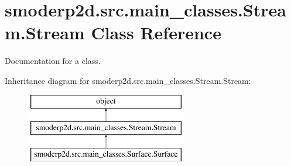 \hypertarget{classsmoderp2d_1_1src_1_1main__classes_1_1Stream_1_1Stream}{\section{smoderp2d.\-src.\-main\-\_\-classes.\-Stream.\-Stream Class Reference}
\label{classsmoderp2d_1_1src_1_1main__classes_1_1Stream_1_1Stream}
}


Documentation for a class.  


Inheritance diagram for smoderp2d.\-src.\-main\-\_\-classes.\-Stream.\-Stream\-:\begin{figure}[H]
\begin{center}
\leavevmode
\includegraphics[height=3.000000cm]{d0/d98/classsmoderp2d_1_1src_1_1main__classes_1_1Stream_1_1Stream}
\end{center}
\end{figure}
